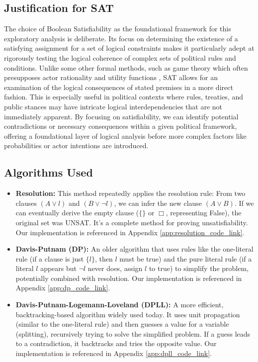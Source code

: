 \documentclass[11pt, a4paper]{article}
\begin{document}
\subsection*{Justification for SAT}
The choice of Boolean Satisfiability as the foundational framework for this exploratory analysis is deliberate. Its focus on determining the existence of a satisfying assignment for a set of logical constraints makes it particularly adept at rigorously testing the logical coherence of complex sets of political rules and conditions. Unlike some other formal methods, such as game theory which often presupposes actor rationality and utility functions \cite{BuenoDeMesquita2003}, SAT allows for an examination of the logical consequences of stated premises in a more direct fashion. This is especially useful in political contexts where rules, treaties, and public stances may have intricate logical interdependencies that are not immediately apparent. By focusing on satisfiability, we can identify potential contradictions or necessary consequences within a given political framework, offering a foundational layer of logical analysis before more complex factors like probabilities or actor intentions are introduced.
\subsection*{Algorithms Used}

\begin{itemize}
    \item \textbf{Resolution:} This method \cite{Robinson1965} repeatedly applies the resolution rule: From two clauses $(A \vee l)$ and $(B \vee \neg l)$, we can infer the new clause $(A \vee B)$. If we can eventually derive the empty clause ($\{\}$ or $\Box$, representing False), the original set was UNSAT. It's a complete method for proving unsatisfiability. Our implementation is referenced in Appendix \ref{app:resolution_code_link}.
    \item \textbf{Davis-Putnam (DP):} An older algorithm \cite{DavisPutnam1960} that uses rules like the one-literal rule (if a clause is just $\{l\}$, then $l$ must be true) and the pure literal rule (if a literal $l$ appears but $\neg l$ never does, assign $l$ to true) to simplify the problem, potentially combined with resolution. Our implementation is referenced in Appendix \ref{app:dp_code_link}.
    \item \textbf{Davis-Putnam-Logemann-Loveland (DPLL):} A more efficient, backtracking-based algorithm \cite{DPLL1962} widely used today. It uses unit propagation (similar to the one-literal rule) and then guesses a value for a variable (splitting), recursively trying to solve the simplified problem. If a guess leads to a contradiction, it backtracks and tries the opposite value. Our implementation is referenced in Appendix \ref{app:dpll_code_link}.
\end{itemize}
\end{document}
